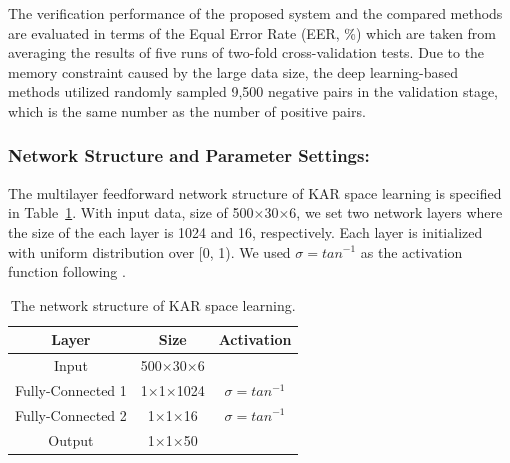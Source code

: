 \documentclass[sigconf]{acmart}
\begin{document}
The verification performance of the proposed system and the compared methods are evaluated in terms of the Equal Error Rate (EER, \%) which are taken from averaging the results of five runs of two-fold cross-validation tests. Due to the memory constraint caused by the large data size, the deep learning-based methods utilized randomly sampled 9,500 negative pairs in the validation stage, which is the same number as the number of positive pairs.

\subsubsection{Network Structure and Parameter Settings:}
The multilayer feedforward network structure of KAR space learning is specified in Table~\ref{tab2}. With input data, size of 500$\times$30$\times$6, we set two network layers where the size of the each layer is 1024 and 16, respectively. Each layer is initialized with uniform distribution over [0, 1). We used $\sigma = {tan}^{-1}$ as the activation function following \cite{toh2018analytic}.
\begin{table}
    \caption{The network structure of KAR space learning.}
    \label{tab2}
    \begin{tabular}{ccc}
     \toprule
     Layer   & Size     & Activation \\
     \midrule
     Input   & 500$\times$30$\times$6 &            \\
     Fully-Connected 1 & 1$\times$1$\times$1024 & $\sigma = {tan}^{-1}$     \\
     Fully-Connected 2 & 1$\times$1$\times$16  & $\sigma = {tan}^{-1}$     \\
     Output  & 1$\times$1$\times$50   &            \\
     \bottomrule
    \end{tabular}
\end{table}
\end{document}
